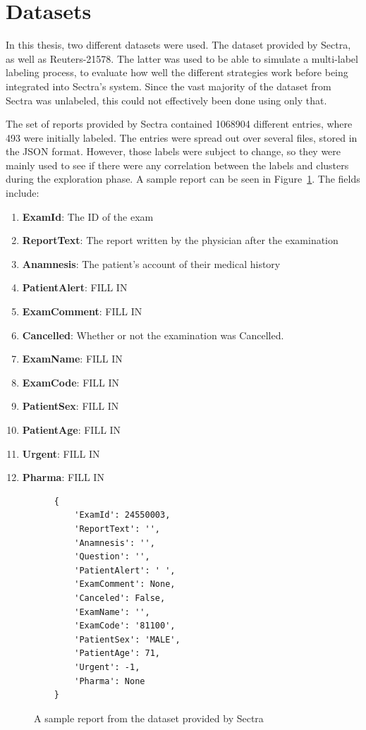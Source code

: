 \section{Datasets}\label{sec:datasets}
In this thesis, two different datasets were used.
The dataset provided by Sectra, as well as Reuters-21578.
The latter was used to be able to simulate a multi-label labeling process, to evaluate how well the different strategies work before being integrated into Sectra's system.
Since the vast majority of the dataset from Sectra was unlabeled, this could not effectively been done using only that.

The set of reports provided by Sectra contained 1068904 different entries, where 493 were initially labeled.
The entries were spread out over several files, stored in the JSON format.
However, those labels were subject to change, so they were mainly used to see if there were any correlation between the labels and clusters during the exploration phase.
A sample report can be seen in Figure~\ref{fig:sample-report}.
The fields include:
\begin{enumerate}
    \item \textbf{ExamId}: The ID of the exam
    \item \textbf{ReportText}: The report written by the physician after the examination
    \item \textbf{Anamnesis}: The patient's account of their medical history
    \item \textbf{PatientAlert}: FILL IN
    \item \textbf{ExamComment}: FILL IN
    \item \textbf{Cancelled}: Whether or not the examination was Cancelled.
    \item \textbf{ExamName}: FILL IN
    \item \textbf{ExamCode}: FILL IN
    \item \textbf{PatientSex}: FILL IN
    \item \textbf{PatientAge}: FILL IN
    \item \textbf{Urgent}: FILL IN
    \item \textbf{Pharma}: FILL IN
\end{enumerate}
\begin{figure}
\begin{verbatim}
    {
        'ExamId': 24550003, 
        'ReportText': '',
        'Anamnesis': '',
        'Question': '',
        'PatientAlert': ' ', 
        'ExamComment': None, 
        'Canceled': False, 
        'ExamName': '',
        'ExamCode': '81100', 
        'PatientSex': 'MALE', 
        'PatientAge': 71, 
        'Urgent': -1, 
        'Pharma': None
    }
\end{verbatim}
\caption{A sample report from the dataset provided by Sectra}
\label{fig:sample-report}
\end{figure}

